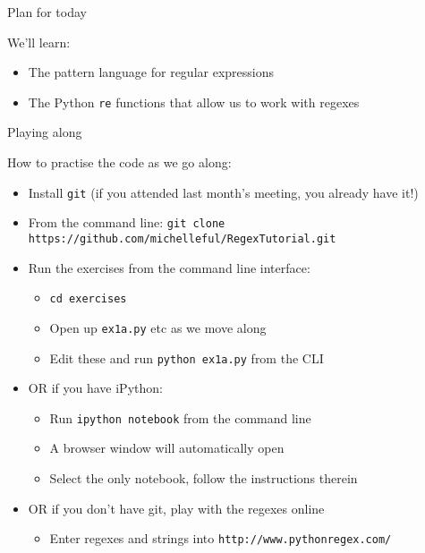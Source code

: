 \documentclass{beamer}
\begin{document}
\begin{frame}{Plan for today}

We'll learn:
\begin{itemize}
 \item The pattern language for regular expressions
 \item The Python \lstinline$re$ functions that allow us to work with regexes
\end{itemize}

\end{frame}

\begin{frame}{Playing along}

How to practise the code as we go along:
\begin{itemize}
 \item Install \lstinline$git$ (if you attended last month's meeting, you already have it!)
 \item From the command line: \lstinline$git clone https://github.com/michelleful/RegexTutorial.git$
 \item Run the exercises from the command line interface:
 \begin{itemize}
   \item \lstinline$cd exercises$
   \item Open up \lstinline$ex1a.py$ etc as we move along
   \item Edit these and run \lstinline$python ex1a.py$ from the CLI
 \end{itemize}
 \item OR if you have iPython:
   \begin{itemize}
    \item Run \lstinline$ipython notebook$ from the command line
    \item A browser window will automatically open
    \item Select the only notebook, follow the instructions therein
   \end{itemize}
 \item OR if you don't have git, play with the regexes online
   \begin{itemize}
    \item Enter regexes and strings into \lstinline$http://www.pythonregex.com/$
   \end{itemize}
\end{itemize}

\end{frame}
\end{document}
